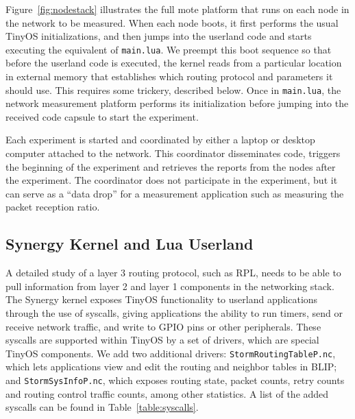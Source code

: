 Figure~\ref{fig:nodestack} illustrates the full mote platform that runs on each node in the network to be measured.
When each node boots, it first performs the usual TinyOS initializations, and then jumps into the userland code and starts executing the equivalent of \texttt{main.lua}.
We preempt this boot sequence so that before the userland code is executed, the kernel reads from a particular location in external memory that establishes which routing protocol and parameters it should use.
This requires some trickery, described below.
Once in \texttt{main.lua}, the network measurement platform performs its initialization before jumping into the received code capsule to start the experiment.

Each experiment is started and coordinated by either a laptop or desktop computer attached to the network.
This coordinator disseminates code, triggers the beginning of the experiment and retrieves the reports from the nodes after the experiment.
The coordinator does not participate in the experiment, but it can serve as a ``data drop'' for a measurement application such as measuring the packet reception ratio.


\subsection{Synergy Kernel and Lua Userland}

A detailed study of a layer 3 routing protocol, such as RPL, needs to be able to pull information from layer 2 and layer 1 components in the networking stack.
The Synergy kernel exposes TinyOS functionality to userland applications through the use of syscalls, giving applications the ability to run timers, send or receive network traffic, and write to GPIO pins or other peripherals.
These syscalls are supported within TinyOS by a set of drivers, which are special TinyOS components.
We add two additional drivers: \texttt{StormRoutingTableP.nc}, which lets applications view and edit the routing and neighbor tables in BLIP; and \texttt{StormSysInfoP.nc}, which exposes routing state, packet counts, retry counts and routing control traffic counts, among other statistics.
A list of the added syscalls can be found in Table~\ref{table:syscalls}.

